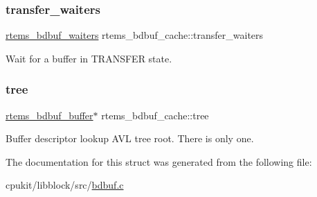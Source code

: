 \subsubsection{\texorpdfstring{transfer\_waiters}{transfer\_waiters}}
{\footnotesize\ttfamily \mbox{\hyperlink{structrtems__bdbuf__waiters}{rtems\+\_\+bdbuf\+\_\+waiters}} rtems\+\_\+bdbuf\+\_\+cache\+::transfer\+\_\+waiters}

Wait for a buffer in T\+R\+A\+N\+S\+F\+ER state. \mbox{\label{structrtems__bdbuf__cache_a6ab293d43edc26f1151a8a6cb332f2fa}} 
\subsubsection{\texorpdfstring{tree}{tree}}
{\footnotesize\ttfamily \mbox{\hyperlink{structrtems__bdbuf__buffer}{rtems\+\_\+bdbuf\+\_\+buffer}}$\ast$ rtems\+\_\+bdbuf\+\_\+cache\+::tree}

Buffer descriptor lookup A\+VL tree root. There is only one. 

The documentation for this struct was generated from the following file\+:\begin{DoxyCompactItemize}
\item 
cpukit/libblock/src/\mbox{\hyperlink{bdbuf_8c}{bdbuf.\+c}}\end{DoxyCompactItemize}
